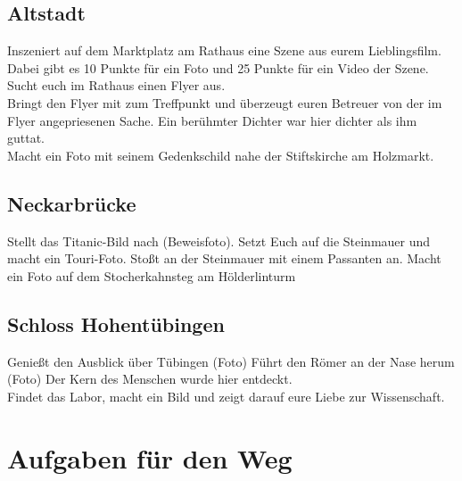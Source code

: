 \documentclass[11pt,paper=a4,answers]{exam}
\renewenvironment{questions}{
	\begin{q}
		\pointsinrightmargin
		\marginpointname{\ Pkt}
		\bracketedpoints }{
	\end{q}}
\begin{document}
\subsection*{Altstadt}
\begin{questions}
\question[10-25] Inszeniert auf dem Marktplatz am Rathaus eine Szene aus eurem Lieblingsfilm. \\
Dabei gibt es 10 Punkte für ein Foto und 25 Punkte für ein Video der Szene.
\question[10] Sucht euch im Rathaus einen Flyer aus. \\
Bringt den Flyer mit zum Treffpunkt und überzeugt euren Betreuer von der im Flyer angepriesenen Sache.
\question[10] Ein berühmter Dichter war hier dichter als ihm guttat. \\
Macht ein Foto mit seinem Gedenkschild nahe der Stiftskirche am Holzmarkt.

\end{questions}

\subsection*{Neckarbrücke}
\begin{questions}
	\question[10] Stellt das Titanic-Bild nach (Beweisfoto).
	\question[10] Setzt Euch auf die Steinmauer und macht ein Touri-Foto. 
	\question[5] Stoßt an der Steinmauer mit einem Passanten an.
	 Macht ein Foto auf dem Stocherkahnsteg am Hölderlinturm

\end{questions}

\subsection*{Schloss Hohentübingen}
\begin{questions}
	\question[10] Genießt den Ausblick über Tübingen (Foto)
	\question[10] Führt den Römer an der Nase herum (Foto)
	\question[10] Der Kern des Menschen wurde hier entdeckt.\\
Findet das Labor, macht ein Bild und zeigt darauf eure Liebe zur Wissenschaft.

\end{questions}

\newpage

\section*{Aufgaben für den Weg}
\end{document}
